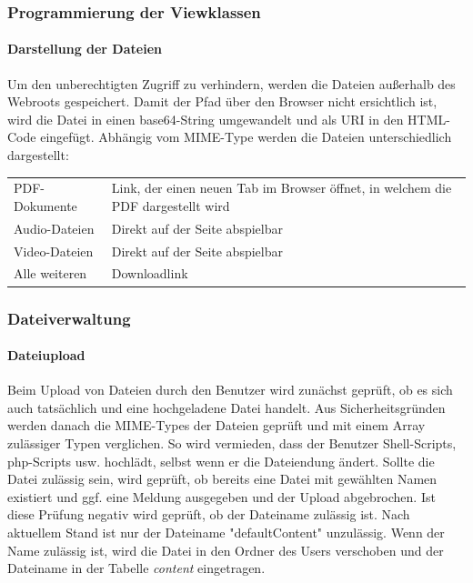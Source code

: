 \documentclass[10pt]{scrarticle}
\begin{document}
\subsubsection{Programmierung der Viewklassen}

\paragraph{Darstellung der Dateien}

Um den unberechtigten Zugriff zu verhindern, werden die Dateien außerhalb des Webroots gespeichert. Damit der Pfad über den Browser nicht ersichtlich ist, wird die Datei in einen base64-String umgewandelt und als URI in den HTML-Code eingefügt. Abhängig vom MIME-Type werden die Dateien unterschiedlich dargestellt:

\FloatBarrier
\begin{table}[ht!]
\begin{tabular}{ll}
PDF-Dokumente & Link, der einen neuen Tab im Browser öffnet, in welchem die PDF dargestellt wird \\
Audio-Dateien & Direkt auf der Seite abspielbar \\
Video-Dateien & Direkt auf der Seite abspielbar \\
Alle weiteren & Downloadlink

\end{tabular}
\end{table}
\FloatBarrier

\subsubsection{Dateiverwaltung}

\paragraph{Dateiupload}

Beim Upload von Dateien durch den Benutzer wird zunächst geprüft, ob es sich auch tatsächlich und eine hochgeladene Datei handelt. Aus Sicherheitsgründen werden danach die MIME-Types der Dateien geprüft und mit einem Array zulässiger Typen verglichen. So wird vermieden, dass der Benutzer Shell-Scripts, php-Scripts usw. hochlädt, selbst wenn er die Dateiendung ändert. Sollte die Datei zulässig sein, wird geprüft, ob bereits eine Datei mit gewählten Namen existiert und ggf. eine Meldung ausgegeben und der Upload abgebrochen. Ist diese Prüfung negativ wird geprüft, ob der Dateiname zulässig ist. Nach aktuellem Stand ist nur der Dateiname "defaultContent" unzulässig. Wenn der Name zulässig ist, wird die Datei in den Ordner des Users verschoben und der Dateiname in der Tabelle \textit{content} eingetragen.
\end{document}
